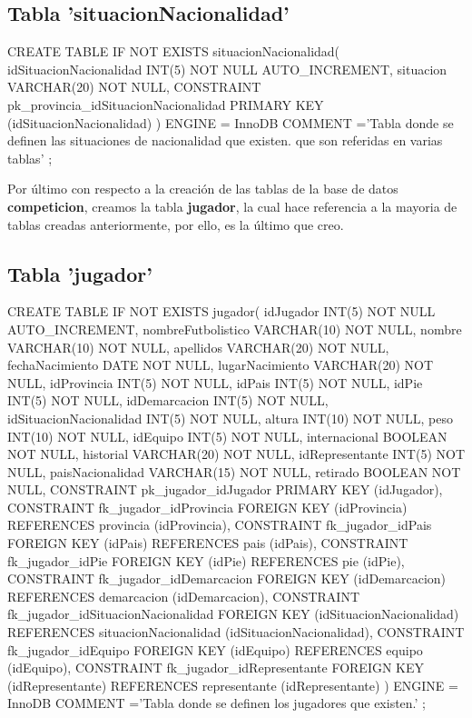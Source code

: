 \documentclass{article}
\begin{document}
  \subsection{Tabla 'situacionNacionalidad'}
    \begin{listing}[style=C]
      CREATE TABLE IF NOT EXISTS situacionNacionalidad(
        idSituacionNacionalidad INT(5) NOT NULL AUTO_INCREMENT,
        situacion VARCHAR(20) NOT NULL,
        CONSTRAINT pk_provincia_idSituacionNacionalidad PRIMARY KEY (idSituacionNacionalidad)
      )
      ENGINE = InnoDB
      COMMENT ='Tabla donde se definen las situaciones de nacionalidad que existen. que son referidas en varias tablas'
      ;
    \end{listing}
  
  Por último con respecto a la creación de las tablas de la base de datos \textbf{competicion}, creamos la tabla \textbf{jugador}, la cual hace referencia a la mayoria 
  de tablas creadas anteriormente, por ello, es la último que creo.

\newpage
  \subsection{Tabla 'jugador'}
    \begin{listing}[style=C]
      CREATE TABLE IF NOT EXISTS jugador(
        idJugador INT(5) NOT NULL AUTO_INCREMENT,
        nombreFutbolistico VARCHAR(10) NOT NULL,
        nombre VARCHAR(10) NOT NULL,
        apellidos VARCHAR(20) NOT NULL,
        fechaNacimiento DATE NOT NULL,
        lugarNacimiento VARCHAR(20) NOT NULL,
        idProvincia INT(5) NOT NULL,
        idPais INT(5) NOT NULL,
        idPie INT(5) NOT NULL,
        idDemarcacion INT(5) NOT NULL,
        idSituacionNacionalidad INT(5) NOT NULL,
        altura INT(10) NOT NULL,
        peso INT(10) NOT NULL,
        idEquipo INT(5) NOT NULL,
        internacional BOOLEAN NOT NULL,
        historial VARCHAR(20) NOT NULL,
        idRepresentante INT(5) NOT NULL,
        paisNacionalidad VARCHAR(15) NOT NULL,
        retirado BOOLEAN NOT NULL,
        CONSTRAINT pk_jugador_idJugador PRIMARY KEY (idJugador),
        CONSTRAINT fk_jugador_idProvincia FOREIGN KEY (idProvincia) REFERENCES provincia (idProvincia),
        CONSTRAINT fk_jugador_idPais FOREIGN KEY (idPais) REFERENCES pais (idPais),
        CONSTRAINT fk_jugador_idPie FOREIGN KEY (idPie) REFERENCES pie (idPie),
        CONSTRAINT fk_jugador_idDemarcacion FOREIGN KEY (idDemarcacion) REFERENCES demarcacion (idDemarcacion),
        CONSTRAINT fk_jugador_idSituacionNacionalidad FOREIGN KEY (idSituacionNacionalidad) REFERENCES situacionNacionalidad (idSituacionNacionalidad),
        CONSTRAINT fk_jugador_idEquipo FOREIGN KEY (idEquipo) REFERENCES equipo (idEquipo),
        CONSTRAINT fk_jugador_idRepresentante FOREIGN KEY (idRepresentante) REFERENCES representante (idRepresentante)
      )
      ENGINE = InnoDB
      COMMENT ='Tabla donde se definen los jugadores que existen.'
      ;
    \end{listing}
\end{document}
